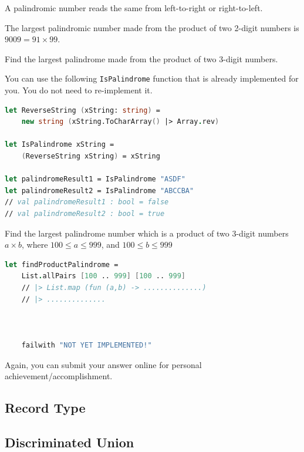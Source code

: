 \documentclass[12pt]{article}
\begin{document}
A palindromic number reads the same from left-to-right or right-to-left. 

The largest palindromic number made from the product of two 2-digit numbers is $9009 = 91 \times 99$.

Find the largest palindrome made from the product of two 3-digit numbers.

You can use the following \texttt{IsPalindrome} function that is already implemented for you. You do not need to re-implement it.
\begin{lstlisting}[language=FSharp]
let ReverseString (xString: string) =
    new string (xString.ToCharArray() |> Array.rev)

let IsPalindrome xString =
    (ReverseString xString) = xString

let palindromeResult1 = IsPalindrome "ASDF"   
let palindromeResult2 = IsPalindrome "ABCCBA" 
// val palindromeResult1 : bool = false
// val palindromeResult2 : bool = true
\end{lstlisting}
Find the largest palindrome number which is a product of two 3-digit numbers $a \times b$, where $100 \leq a \leq 999$, and $100 \leq b \leq 999$
\begin{lstlisting}[language=FSharp]
let findProductPalindrome =
    List.allPairs [100 .. 999] [100 .. 999]
    // |> List.map (fun (a,b) -> ..............)
    // |> ..............



    failwith "NOT YET IMPLEMENTED!"
\end{lstlisting}
Again, you can submit your answer online for personal achievement/accomplishment.
\subsection{Record Type}

\subsection{Discriminated Union}
\end{document}

